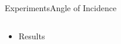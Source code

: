 \begin{frame}{Experiments}{Angle of Incidence}		
	\begin{columns}
		\begin{column}{0.5\textwidth}
			\begin{itemize}
				\item Results
			\end{itemize}
		\end{column}
		\begin{column}{0.5\textwidth} 
			\begin{figure}[h]
			\end{figure}
		\end{column}
	\end{columns}
\end{frame}

